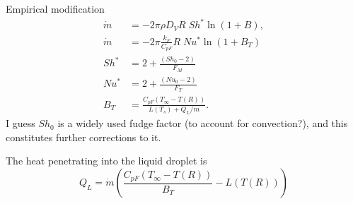 \documentclass[12pt,twoside]{report}
\begin{document}
Empirical modification \cite{Abramzon1988}
\begin{align}
  \dot{m} &= - 2\pi \rho D_V R \; Sh^* \ln{(1 + B)}, \\
  \dot{m} &= - 2\pi \frac{k_F}{C_{pF}} R \; Nu^* \ln{(1 + B_T)} \\
  Sh^* &= 2 + \frac{(Sh_0 - 2)}{F_M} \\
  Nu^* &= 2 + \frac{(Nu_0 - 2)}{F_T} \\
  B_T &= \frac{C_{pF} (T_\infty - T(R))}{L(T_s) + Q_L / \dot{m}}.
\end{align}
I guess $Sh_0$ is a widely used fudge factor (to account for convection?), and this constitutes further corrections to it.

The heat penetrating into the liquid droplet is \cite{Abramzon1988}
\begin{equation}
  Q_L = \dot{m} \left( \frac{C_{pF} (T_\infty - T(R))}{B_T} - L(T(R)) \right)
\end{equation}


\end{document}
